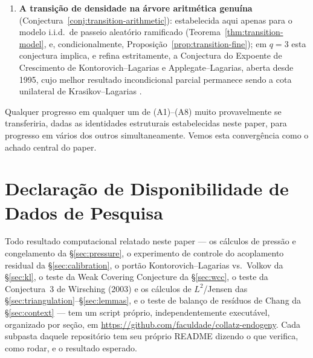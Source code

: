 \documentclass[11pt]{article}
\theoremstyle{definition}
\theoremstyle{remark}
\begin{document}
\begin{enumerate}[label=(A\arabic*)]
  raízes, a comparação pré-registrada pedida acima) produziu, pela
  primeira vez nesta investigação, um platô de estabilidade de limiar
  de GPD limpo no valor previsto em todos os níveis de limiar testados,
  uma estimativa de Hill com correção de viés fortemente concentrada e
  consistente com ele em todos os níveis de headroom, e um teste de
  Vuong contra uma alternativa lognormal truncada que deixa de
  favorecer a alternativa. Duas calibrações de sanidade (contra uma
  amostra sintética exata de Pareto no índice previsto, e contra um
  expoente de normalização propositalmente mal especificado) não
  encontraram artefato por trás dessa mudança. Consideramos a
  conjectura agora fortemente apoiada para $q=5$, embora não provada: o
  teste de Vuong dá não-rejeição, não confirmação, e o martingale
  subjacente provadamente ainda está em regime pré-assintótico no
  headroom alcançado (sua mediana continua a variar com o headroom
  mesmo quando o índice de cauda estimado não varia). Esta era,
  honestamente, a alegação com apoio mais fraco do paper; já não é,
  mas continua sendo a única que repousa sobre evidência estatística
  em vez de uma derivação fechada.
\item \textbf{A transição de densidade na árvore aritmética genuína}
  (Conjectura~\ref{conj:transition-arithmetic}): estabelecida aqui
  apenas para o modelo i.i.d.\ de passeio aleatório ramificado
  (Teorema~\ref{thm:transition-model}, e, condicionalmente,
  Proposição~\ref{prop:transition-fine}); em $q=3$ esta conjectura
  implica, e refina estritamente, a Conjectura do Expoente de
  Crescimento de Kontorovich--Lagarias e Applegate--Lagarias, aberta
  desde 1995, cujo melhor resultado incondicional parcial permanece
  sendo a cota unilateral de Krasikov--Lagarias
  \cite{KrasikovLagarias2003}.
\end{enumerate}

Qualquer progresso em qualquer um de (A1)--(A8) muito provavelmente se
transferiria, dadas as identidades estruturais estabelecidas neste
paper, para progresso em vários dos outros simultaneamente. Vemos esta
convergência como o achado central do paper.

\section*{Declaração de Disponibilidade de Dados de Pesquisa}

Todo resultado computacional relatado neste paper --- os cálculos de
pressão e congelamento da \S\ref{sec:pressure}, o experimento de
controle do acoplamento residual da \S\ref{sec:calibration}, o portão
Kontorovich--Lagarias vs.\ Volkov da \S\ref{sec:kl}, o teste da Weak
Covering Conjecture da \S\ref{sec:wcc}, o teste da Conjectura~3 de
Wirsching (2003) e os cálculos de $L^2$/Jensen das
\S\ref{sec:triangulation}--\S\ref{sec:lemmas}, e o teste de balanço de
resíduos de Chang da \S\ref{sec:context} --- tem um script próprio,
independentemente executável, organizado por seção, em
\url{https://github.com/faculdade/collatz-endogeny}. Cada subpasta
daquele repositório tem seu próprio README dizendo o que verifica,
como rodar, e o resultado esperado.
\end{document}
